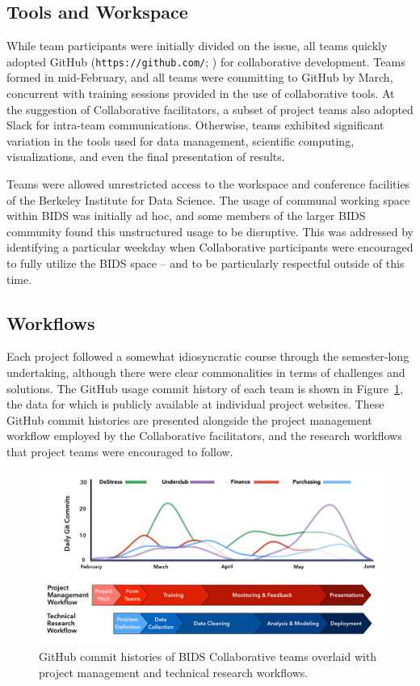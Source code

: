 \documentclass[12pt]{article}
\begin{document}
\subsection{Tools and Workspace}

While team participants were initially divided on the issue, all teams quickly adopted GitHub (\texttt{https://github.com/}; \cite{dabbish2012social}) for collaborative development.  Teams formed in mid-February, and all teams were committing to GitHub by March, concurrent with training sessions provided in the use of collaborative tools.  At the suggestion of Collaborative facilitators, a subset of project teams also adopted Slack for intra-team communications.  Otherwise, teams exhibited significant variation in the tools used for data management, scientific computing, visualizations, and even the final presentation of results.

Teams were allowed unrestricted access to the workspace and conference facilities of the Berkeley Institute for Data Science.  The usage of communal working space within BIDS was initially ad hoc, and some members of the larger BIDS community found this unstructured usage to be disruptive. This was addressed by identifying a particular weekday when Collaborative participants were encouraged to fully utilize the BIDS space -- and to be particularly respectful outside of this time.

\subsection{Workflows}

Each project followed a somewhat idiosyncratic course through the semester-long undertaking, although there were clear commonalities in terms of challenges and solutions.  The GitHub usage commit history of each team is shown in Figure~\ref{fig:gitcommits}, the data for which is publicly available at individual project websites.  These GitHub commit histories are presented alongside the project management workflow employed by the Collaborative facilitators, and the research workflows that project teams were encouraged to follow.

\begin{figure}[h]
\centerline{\includegraphics[scale=0.435]{BIDS_Collaborative_Workflow_NEW.png}}
\caption{GitHub commit histories of BIDS Collaborative teams overlaid with project management and technical research workflows.}
\label{fig:gitcommits}
\end{figure}
\end{document}
